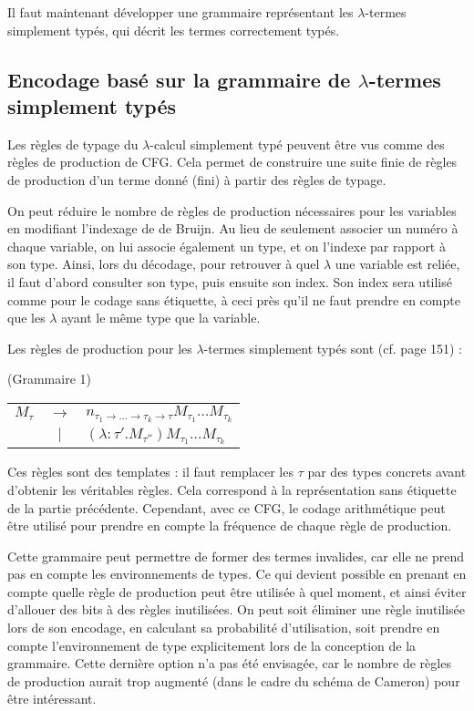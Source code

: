 \documentclass[titlepage]{article}
\begin{document}
Il faut maintenant développer une grammaire représentant les $\lambda$-termes simplement typés, qui décrit les termes correctement typés.

\subsection{Encodage basé sur la grammaire de $\lambda$-termes simplement typés}
Les règles de typage du $\lambda$-calcul simplement typé peuvent être vus comme des règles de production de CFG. Cela permet de construire une suite finie de règles de production d'un terme donné (fini) à partir des règles de typage.

On peut réduire le nombre de règles de production nécessaires pour les variables en modifiant l'indexage de de Bruijn. Au lieu de seulement associer un numéro à chaque variable, on lui associe également un type, et on l'indexe par rapport à son type. Ainsi, lors du décodage, pour retrouver à quel $\lambda$ une variable est reliée, il faut d'abord consulter son type, puis ensuite son index. Son index sera utilisé comme pour le codage sans étiquette, à ceci près qu'il ne faut prendre en compte que les $\lambda$ ayant le même type que la variable.

Les règles de production pour les $\lambda$-termes simplement typés sont (cf. page 151) :
\begin{center}
  (Grammaire 1)
   \begin{tabular}{ c c l }
     $M_\tau$ & $\to$ & $n_{\tau_1 \to \dots \to \tau_k \to \tau}M_{\tau_1}\dots M_{\tau_k}$ \\
     & $\vert$ & $(\lambda : \tau' .M_{\tau''})M_{\tau_1}\dots M_{\tau_k}$ \\
   \end{tabular}
 \end{center}
Ces règles sont des templates : il faut remplacer les $\tau$ par des types concrets avant d'obtenir les véritables règles. Cela correspond à la représentation sans étiquette de la partie précédente. Cependant, avec ce CFG, le codage arithmétique peut être utilisé pour prendre en compte la fréquence de chaque règle de production.

Cette grammaire peut permettre de former des termes invalides, car elle ne prend pas en compte les environnements de types. Ce qui devient possible en prenant en compte quelle règle de production peut être utilisée à quel moment, et ainsi éviter d'allouer des bits à des règles inutilisées. On peut soit éliminer une règle inutilisée lors de son encodage, en calculant sa probabilité d'utilisation, soit prendre en compte l'environnement de type explicitement lors de la conception de la grammaire. Cette dernière option n'a pas été envisagée, car le nombre de règles de production aurait trop augmenté (dans le cadre du schéma de Cameron) pour être intéressant.
\end{document}
